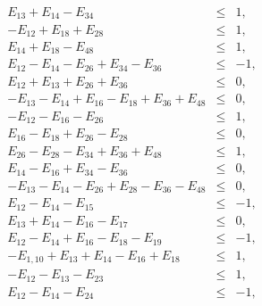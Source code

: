 \documentclass[%
 showpacs,
 showkeys,
 preprintnumbers,
 amsmath,amssymb,
 aps,
  pra,
  longbibliography,
 floatfix,
 ]{revtex4-1}
\begin{document}
\begin{eqnarray}
 E_{13} + E_{14} - E_{34} &\le&  1,                                                                          \\
-E_{12} + E_{18} + E_{28} &\le&  1,                                                                          \\
 E_{14} + E_{18} - E_{48} &\le&  1,                                                                          \\
 E_{12} - E_{14} - E_{26} + E_{34} - E_{36} &\le&  -1,                                                       \\
 E_{12} + E_{13} + E_{26} + E_{36} &\le&  0,                                                                 \\
-E_{13} - E_{14} + E_{16} - E_{18} + E_{36} + E_{48} &\le&    0,                                             \\
-E_{12} - E_{16} - E_{26} &\le&  1,                                                                          \\
E_{16} - E_{18} + E_{26} - E_{28} &\le&  0,                                                                  \\
 E_{26} - E_{28} - E_{34} + E_{36} + E_{48} &\le&  1,                                                        \\
 E_{14} - E_{16} + E_{34} - E_{36} &\le&  0,                                                                 \\
-E_{13} - E_{14} - E_{26} + E_{28} - E_{36} - E_{48} &\le&  0,                                               \\
 E_{12} - E_{14} - E_{15} &\le&  -1,                                                                         \\
 E_{13} + E_{14} - E_{16} - E_{17} &\le&  0,                                                                 \\
 E_{12} - E_{14} + E_{16} - E_{18} - E_{19} &\le&  -1,                                                       \\
-E_{1,10} + E_{13} + E_{14} - E_{16} + E_{18} &\le&    1,                                                    \\
-E_{12} - E_{13} - E_{23} &\le&  1,                                                                          \\
 E_{12} - E_{14} - E_{24} &\le&  -1,                                                                         \\

\end{eqnarray}
\end{document}
